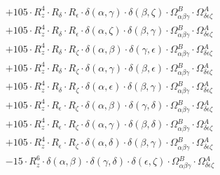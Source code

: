 \documentclass{article}
\begin{document}
\begin{equation}
\begin{array}{c}
 \\[0.2em] 		 + 105 \cdot R_{z}^{4} \cdot R_{\delta{}} \cdot R_{\epsilon{}} \cdot \delta{}\left(\alpha{}, \gamma{}\right) \cdot \delta{}\left(\beta{}, \zeta{}\right) \cdot \Omega{}^{B}_{\alpha{}\beta{}\gamma{}} \cdot \Omega{}^{A}_{\delta{}\epsilon{}\zeta{}} 
 \\[0.2em] 		 + 105 \cdot R_{z}^{4} \cdot R_{\delta{}} \cdot R_{\epsilon{}} \cdot \delta{}\left(\alpha{}, \zeta{}\right) \cdot \delta{}\left(\beta{}, \gamma{}\right) \cdot \Omega{}^{B}_{\alpha{}\beta{}\gamma{}} \cdot \Omega{}^{A}_{\delta{}\epsilon{}\zeta{}} 
 \\[0.2em] 		 + 105 \cdot R_{z}^{4} \cdot R_{\delta{}} \cdot R_{\zeta{}} \cdot \delta{}\left(\alpha{}, \beta{}\right) \cdot \delta{}\left(\gamma{}, \epsilon{}\right) \cdot \Omega{}^{B}_{\alpha{}\beta{}\gamma{}} \cdot \Omega{}^{A}_{\delta{}\epsilon{}\zeta{}} 
 \\[0.2em] 		 + 105 \cdot R_{z}^{4} \cdot R_{\delta{}} \cdot R_{\zeta{}} \cdot \delta{}\left(\alpha{}, \gamma{}\right) \cdot \delta{}\left(\beta{}, \epsilon{}\right) \cdot \Omega{}^{B}_{\alpha{}\beta{}\gamma{}} \cdot \Omega{}^{A}_{\delta{}\epsilon{}\zeta{}} 
 \\[0.2em] 		 + 105 \cdot R_{z}^{4} \cdot R_{\delta{}} \cdot R_{\zeta{}} \cdot \delta{}\left(\alpha{}, \epsilon{}\right) \cdot \delta{}\left(\beta{}, \gamma{}\right) \cdot \Omega{}^{B}_{\alpha{}\beta{}\gamma{}} \cdot \Omega{}^{A}_{\delta{}\epsilon{}\zeta{}} 
 \\[0.2em] 		 + 105 \cdot R_{z}^{4} \cdot R_{\epsilon{}} \cdot R_{\zeta{}} \cdot \delta{}\left(\alpha{}, \beta{}\right) \cdot \delta{}\left(\gamma{}, \delta{}\right) \cdot \Omega{}^{B}_{\alpha{}\beta{}\gamma{}} \cdot \Omega{}^{A}_{\delta{}\epsilon{}\zeta{}} 
 \\[0.2em] 		 + 105 \cdot R_{z}^{4} \cdot R_{\epsilon{}} \cdot R_{\zeta{}} \cdot \delta{}\left(\alpha{}, \gamma{}\right) \cdot \delta{}\left(\beta{}, \delta{}\right) \cdot \Omega{}^{B}_{\alpha{}\beta{}\gamma{}} \cdot \Omega{}^{A}_{\delta{}\epsilon{}\zeta{}} 
 \\[0.2em] 		 + 105 \cdot R_{z}^{4} \cdot R_{\epsilon{}} \cdot R_{\zeta{}} \cdot \delta{}\left(\alpha{}, \delta{}\right) \cdot \delta{}\left(\beta{}, \gamma{}\right) \cdot \Omega{}^{B}_{\alpha{}\beta{}\gamma{}} \cdot \Omega{}^{A}_{\delta{}\epsilon{}\zeta{}} 
 \\[0.2em] 		 - 15 \cdot R_{z}^{6} \cdot \delta{}\left(\alpha{}, \beta{}\right) \cdot \delta{}\left(\gamma{}, \delta{}\right) \cdot \delta{}\left(\epsilon{}, \zeta{}\right) \cdot \Omega{}^{B}_{\alpha{}\beta{}\gamma{}} \cdot \Omega{}^{A}_{\delta{}\epsilon{}\zeta{}} 

\end{array}
\end{equation}
\end{document}
